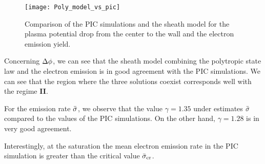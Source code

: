 \begin{figure}[hbtp]
  \centering
  \texttt{[image: Poly\_model\_vs\_pic]}
  \caption{Comparison of the PIC simulations and the sheath model for the plasma potential drop from the center to the wall and the electron emission yield. }
  \label{fig-Poly_model_vs_pic}
\end{figure}

Concerning $\Delta \phi$, we can see that the sheath model combining the polytropic state law and the electron emission is in good agreement with the \ac{PIC} simulations.
We can see that the region where the three solutions coexist corresponds well with the regime {\bf II}.

For the emission rate $ \bar{\sigma }$, we observe that the value $\gamma=1.35$ under estimates $ \bar{\sigma }$ compared to the values of the \ac{PIC} simulations.
On the other hand, $\gamma=1.28$ is in very good agreement.

Interestingly, at the saturation the mean electron emission rate in the \ac{PIC} simulation is greater than the critical value $ \bar{\sigma }_{\rm cr}$.
